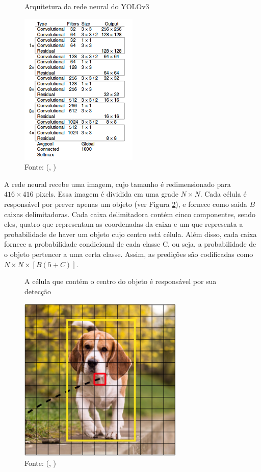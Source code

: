 \documentclass[]{politex}
\begin{document}
\begin{figure}[H]
    \centering
    \caption{Arquitetura da rede neural do YOLOv3}
    \includegraphics[width=0.5\textwidth]{Arquitetura_YOLOv3}
    \caption*{Fonte: (, \citeyear{yolov3})}
    \label{fig:yolo_arquitetura}
\end{figure}

A rede neural recebe uma imagem, cujo tamanho é redimensionado para \(416 \times 416\) pixels. Essa imagem é dividida em uma grade \(N \times N\). Cada célula é responsável por prever apenas um objeto (ver Figura \ref{fig:yolo_grid}), e fornece como saída \(B\) caixas delimitadoras. Cada caixa delimitadora contém cinco componentes, sendo eles, quatro que representam as coordenadas da caixa e um que representa a probabilidade de haver um objeto cujo centro está célula. Além disso, cada caixa fornece a probabilidade condicional de cada classe C, ou seja, a probabilidade de o objeto pertencer a uma certa classe. Assim, as predições são codificadas como \(N \times N \times [B(5+C)]\).

\begin{figure}[H]
    \centering
    \caption{A célula que contém o centro do objeto é responsável por sua detecção}
    \includegraphics[width=0.7\textwidth]{YOLO_grid}
    \caption*{Fonte: (, \citeyear{kathuria})}
    \label{fig:yolo_grid}
\end{figure}
\end{document}
